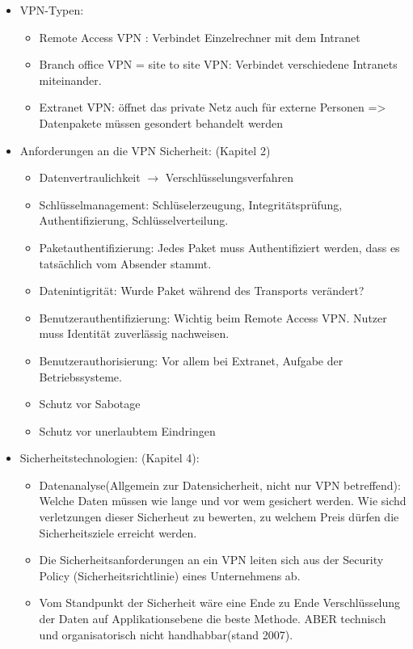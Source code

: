 \begin{itemize}
	\item VPN-Typen: \begin{itemize}	
					 \item Remote Access VPN : Verbindet Einzelrechner mit dem Intranet
					 \item Branch office VPN = site to site VPN: Verbindet verschiedene Intranets miteinander.
					 \item Extranet VPN: öffnet das private Netz auch für externe Personen => Datenpakete müssen gesondert behandelt werden
					 \end{itemize}	
   \item Anforderungen an die VPN Sicherheit: (Kapitel 2)
					\begin{itemize}
					\item Datenvertraulichkeit $\rightarrow$ Verschlüsselungsverfahren
					\item Schlüsselmanagement: Schlüselerzeugung, Integritätsprüfung, Authentifizierung, Schlüsselverteilung.
					\item Paketauthentifizierung: Jedes Paket muss Authentifiziert werden, dass es tatsächlich vom Absender stammt. 
					\item Datenintigrität: Wurde Paket während des Transports verändert?
					\item Benutzerauthentifizierung: Wichtig beim Remote Access VPN. Nutzer muss Identität zuverlässig nachweisen.
					\item Benutzerauthorisierung: Vor allem bei Extranet, Aufgabe der Betriebssysteme.
					\item Schutz vor Sabotage
					\item Schutz vor unerlaubtem Eindringen
					\end{itemize}
  \item Sicherheitstechnologien: (Kapitel 4): 
  					\begin{itemize}
  					\item Datenanalyse(Allgemein zur Datensicherheit, nicht nur VPN betreffend): Welche Daten müssen wie lange und vor wem gesichert werden. Wie sichd verletzungen dieser Sicherheut zu bewerten, zu welchem Preis dürfen die Sicherheitsziele erreicht werden. 
  					\item Die Sicherheitsanforderungen an ein VPN leiten sich aus der Security Policy (Sicherheitsrichtlinie) eines Unternehmens ab. 
  					\item Vom Standpunkt der Sicherheit wäre eine Ende zu Ende Verschlüsselung der Daten auf Applikationsebene die beste Methode. ABER technisch und organisatorisch nicht handhabbar(stand 2007).

\end{itemize}
\end{itemize}
